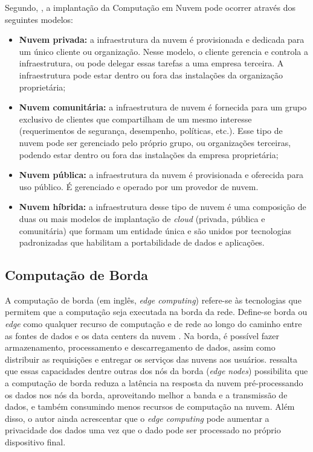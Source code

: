 Segundo, , a implantação da Computação em Nuvem pode
ocorrer através dos seguintes modelos:

\begin{itemize}
    
    \item \textbf{Nuvem privada:} a infraestrutura da nuvem é provisionada e
    dedicada para um único cliente ou organização. Nesse modelo, o cliente
    gerencia e controla a infraestrutura, ou pode delegar essas tarefas a uma
    empresa terceira. A infraestrutura pode estar dentro ou fora das instalações
    da organização proprietária;

    \item \textbf{Nuvem comunitária:} a infraestrutura de nuvem é fornecida para
    um grupo exclusivo de clientes que compartilham de um mesmo interesse
    (requerimentos de segurança, desempenho, políticas, etc.). Esse tipo de
    nuvem pode ser gerenciado pelo próprio grupo, ou organizações terceiras,
    podendo estar dentro ou fora das instalações da empresa proprietária;

    \item \textbf{Nuvem pública:} a infraestrutura da nuvem é provisionada e
    oferecida para uso público. É gerenciado e operado por um provedor de nuvem.
    
    \item \textbf{Nuvem híbrida:} a infraestrutura desse tipo de nuvem é uma
    composição de duas ou mais modelos de implantação de \emph{cloud} (privada,
    pública e comunitária) que formam um entidade única e são unidos por
    tecnologias padronizadas que habilitam a portabilidade de dados e
    aplicações.

\end{itemize}

\subsection{Computação de Borda}

A computação de borda (em inglês, \emph{edge computing}) refere-se às
tecnologias que permitem que a computação seja executada na borda da rede.
Define-se borda ou \emph{edge} como qualquer recurso de computação e de rede ao
longo do caminho entre as fontes de dados e os data centers da nuvem
\cite{Shi2016}. Na borda, é possível fazer armazenamento, processamento e
descarregamento de dados, assim como distribuir as requisições e entregar os
serviços das nuvens aos usuários.  ressalta que essas
capacidades dentre outras dos nós da borda (\emph{edge nodes}) possibilita que a
computação de borda reduza a latência na resposta da nuvem pré-processando os
dados nos nós da borda, aproveitando melhor a banda e a transmissão de dados, e
também consumindo menos recursos de computação na nuvem. Além disso, o autor
ainda acrescentar que o \emph{edge computing} pode aumentar a privacidade dos
dados uma vez que o dado pode ser processado no próprio dispositivo final.

